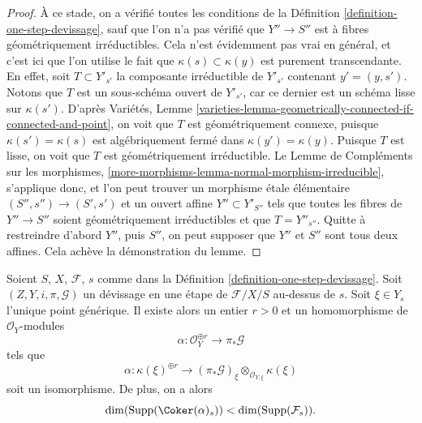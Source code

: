 \begin{proof}
\medskip\noindent
À ce stade, on a vérifié toutes les conditions de la
Définition \ref{definition-one-step-devissage},
sauf que l'on n'a pas vérifié que $Y'' \to S''$ est à fibres géométriquement
irréductibles. Cela n'est évidemment pas vrai en général,
et c'est ici que l'on utilise le fait que
$\kappa(s) \subset \kappa(y)$ est purement transcendante. En effet,
soit $T \subset Y'_{s'}$ la composante irréductible de
$Y'_{s'}$ contenant $y' = (y, s')$. Notons que $T$ est un sous-schéma ouvert
de $Y'_{s'}$, car ce dernier est un schéma lisse sur $\kappa(s')$. D'après
Variétés,
Lemme \ref{varieties-lemma-geometrically-connected-if-connected-and-point},
on voit que $T$ est géométriquement connexe, puisque $\kappa(s') = \kappa(s)$
est algébriquement fermé dans $\kappa(y') = \kappa(y)$.
Puisque $T$ est lisse, on voit que $T$ est géométriquement irréductible. Le
Lemme de Compléments sur les morphismes,
\ref{more-morphisms-lemma-normal-morphism-irreducible},
s'applique donc, et l'on peut trouver un morphisme \'etale élémentaire
$(S'', s'') \to (S', s')$ et un ouvert affine $Y'' \subset Y'_{S''}$
tels que toutes les fibres de $Y'' \to S''$ soient géométriquement irréductibles
et que $T = Y''_{s''}$. Quitte à restreindre d'abord $Y''$, puis $S''$,
on peut supposer que $Y''$ et $S''$ sont tous deux affines.
Cela achève la démonstration du lemme.
\end{proof}

\begin{lemma}
\label{lemma-existence-alpha}
Soient $S$, $X$, $\mathcal{F}$, $s$ comme dans la
Définition \ref{definition-one-step-devissage}.
Soit $(Z, Y, i, \pi, \mathcal{G})$ un d\'evissage en une étape
de $\mathcal{F}/X/S$ au-dessus de $s$.
Soit $\xi \in Y_s$ l'unique point générique.
Il existe alors un entier $r > 0$ et un homomorphisme de $\mathcal{O}_Y$-modules
$$
\alpha : \mathcal{O}_Y^{\oplus r} \longrightarrow \pi_*\mathcal{G}
$$
tels que
$$
\alpha :
\kappa(\xi)^{\oplus r}
\longrightarrow
(\pi_*\mathcal{G})_\xi \otimes_{\mathcal{O}_{Y, \xi}} \kappa(\xi)
$$
soit un isomorphisme. De plus, on a alors
$$
\dim(\text{Supp}(\Coker(\alpha)_s)) < \dim(\text{Supp}(\mathcal{F}_s)).
$$
\end{lemma}

